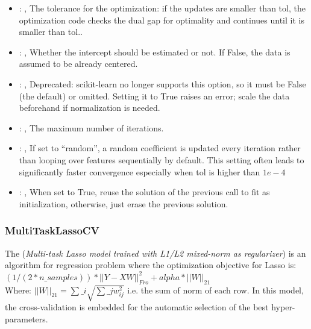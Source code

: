 \begin{itemize}
    \item {}: ,
      The tolerance for the optimization: if the updates are smaller
      than tol, the optimization code checks the dual gap for optimality and
      continues until it is smaller than tol..

    \item {}: ,
      Whether the intercept should be estimated or not. If False,
      the data is assumed to be already centered.

    \item {}: ,
      Deprecated: scikit-learn no longer supports this option, so it must be False (the default) or
      omitted.                                                  Setting it to True raises an error;
      scale the data beforehand if normalization is needed.

    \item {}: ,
      The maximum number of iterations.

    \item {}: ,
      If set to ``random'', a random coefficient is updated every iteration
      rather than looping over features sequentially by default. This setting
      often leads to significantly faster convergence especially when tol is higher than $1e-4$

    \item {}: ,
      When set to True, reuse the solution of the previous call
      to fit as initialization, otherwise, just erase the previous solution.
  \end{itemize}


\subsubsection{MultiTaskLassoCV}
  The  (\textit{Multi-task Lasso model trained
  with L1/L2 mixed-norm as regularizer}) is an algorithm for regression problem
  where the optimization objective for Lasso is:                         $(1 / (2 * n\_samples)) *
  ||Y - XW||^2_{Fro} + alpha * ||W||_{21}$                         \\Where:
  $||W||_{21} = \sum\_i \sqrt{\sum\_j w_{ij}^2}$                         i.e. the sum of norm of each
  row.                         In this model, the cross-validation is embedded for the automatic
  selection                         of the best hyper-parameters.


